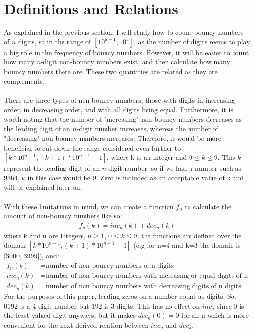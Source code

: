 \documentclass[titlepage,12pt]{article}
\begin{document}
\section{Definitions and Relations}
As explained in the previous section, I will study how to count bouncy numbers of $n$ digits, so in the range of $[10^{n-1}, 10^n]$, as the number of digits seems to play a big role in the frequency of bouncy numbers. However, it will be easier to count how many $n$-digit non-bouncy numbers exist, and then calculate how many bouncy numbers there are. These two quantities are related as they are complements.
\\
\\
There are three types of non bouncy numbers, those with digits in increasing order, in decreasing order, and with all digits being equal. Furthermore, it is worth noting that the number of "increasing" non-bouncy numbers decreases as the leading digit of an $n$-digit number increases, whereas the number of "decreasing" non bouncy numbers increases. Therefore, it would be more beneficial to cut down the range considered even further to $[k*10^{n-1}, (k+1)*10^{n-1}-1]$, where k is an integer and $0 \leq k \leq 9$. This $k$ represent the leading digit of an $n$-digit number, so if we had a number such as 9364, $k$ in this case would be 9. Zero is included as an acceptable value of k and will be explained later on.
\\
\\
With these limitations in mind, we can create a function $f_n$ to calculate the amount of non-bouncy numbers like so:
\begin{equation} \label{eq1}
    \begin{split}
        f_n(k)=inc_n(k) + dec_n(k)
    \end{split}
\end{equation}
where k and n are integers, $n \geq 1$, $0 \leq k \leq 9$, the functions are defined over the domain $[k*10^{n-1}, (k+1)*10^{n-1}-1]$ (e.g for n=4 and k=3 the domain is [3000, 3999]), and:
\begin{align*}
    f_n(k) &= \text{number of non bouncy numbers of n digits}\\
    inc_n(k) &= \text{number of non bouncy numbers with increasing or equal digits of n digits}\\
    dec_n(k) &= \text{number of non bouncy numbers with decreasing digits of n digits}
\end{align*}
\noindent
For the purposes of this paper, leading zeros on a number count as digits. So, $0192$ is a 4 digit number but $192$ is 3 digits. This has no effect on $inc_n$ since 0 is the least valued digit anyways, but it makes $dec_n(0)=0$ for all n which is more convenient for the next derived relation between $inc_n$ and $dec_n$.\\\\
\end{document}
